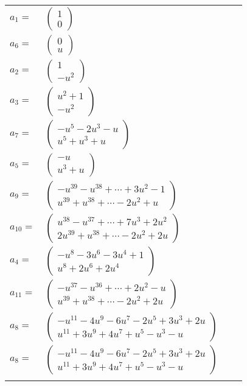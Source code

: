 \documentclass[1p]{elsarticle_modified}
\theoremstyle{definition}
\begin{document}
\begin{tabular}{m{7pt} m{180pt} m{7pt} m{180pt} }
\flushright $a_{1}=$&$\begin{pmatrix}1\\0\end{pmatrix}$ \\
\flushright $a_{6}=$&$\begin{pmatrix}0\\u\end{pmatrix}$ \\
\flushright $a_{2}=$&$\begin{pmatrix}1\\- u^2\end{pmatrix}$ \\
\flushright $a_{3}=$&$\begin{pmatrix}u^2+1\\- u^2\end{pmatrix}$ \\
\flushright $a_{7}=$&$\begin{pmatrix}- u^5-2 u^3- u\\u^5+u^3+u\end{pmatrix}$ \\
\flushright $a_{5}=$&$\begin{pmatrix}- u\\u^3+u\end{pmatrix}$ \\
\flushright $a_{9}=$&$\begin{pmatrix}- u^{39}- u^{38}+\cdots+3 u^2-1\\u^{39}+u^{38}+\cdots-2 u^2+u\end{pmatrix}$ \\
\flushright $a_{10}=$&$\begin{pmatrix}u^{38}- u^{37}+\cdots+7 u^3+2 u^2\\2 u^{39}+u^{38}+\cdots-2 u^2+2 u\end{pmatrix}$ \\
\flushright $a_{4}=$&$\begin{pmatrix}- u^8-3 u^6-3 u^4+1\\u^8+2 u^6+2 u^4\end{pmatrix}$ \\
\flushright $a_{11}=$&$\begin{pmatrix}- u^{37}- u^{36}+\cdots+2 u^2- u\\u^{39}+u^{38}+\cdots-2 u^2+2 u\end{pmatrix}$ \\
\flushright $a_{8}=$&$\begin{pmatrix}- u^{11}-4 u^9-6 u^7-2 u^5+3 u^3+2 u\\u^{11}+3 u^9+4 u^7+u^5- u^3- u\end{pmatrix}$\\ \flushright $a_{8}=$&$\begin{pmatrix}- u^{11}-4 u^9-6 u^7-2 u^5+3 u^3+2 u\\u^{11}+3 u^9+4 u^7+u^5- u^3- u\end{pmatrix}$\\&\end{tabular}
\end{document}

